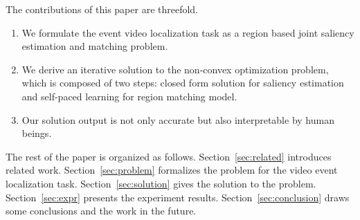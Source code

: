 The contributions of this paper are threefold. 
\begin{enumerate}
\item We formulate the event video localization task as a region based joint saliency estimation and matching problem. 
\item We derive an iterative solution to the non-convex optimization problem, which is composed of two steps: closed form solution for saliency estimation and self-paced learning for region matching model. 
\item Our solution output is not only accurate but also interpretable by human beings. 
\end{enumerate}

The rest of the paper is organized as follows. 
Section~\ref{sec:related} introduces related work. 
Section~\ref{sec:problem} formalizes the problem for the video event localization task. 
Section~\ref{sec:solution} gives the solution to the problem. 
Section~\ref{sec:expr} presents the experiment results. 
Section~\ref{sec:conclusion} draws some conclusions and the work in the future.
